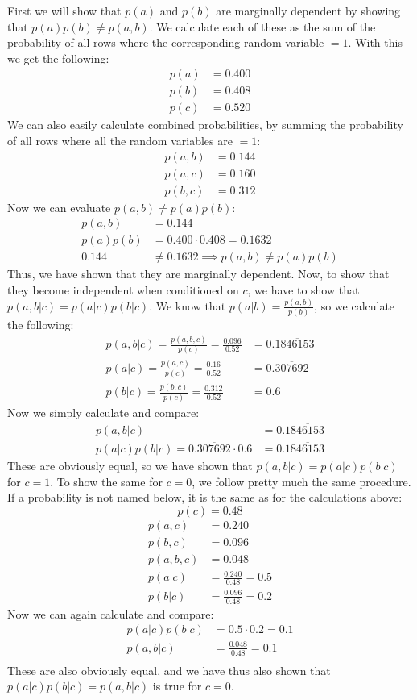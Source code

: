 First we will show that $p(a)$ and $p(b)$ are marginally dependent by showing that $p(a)p(b) \neq p(a,b)$. We calculate each of these as the sum of the probability of all rows where the corresponding random variable $=1$. With this we get the following:
\begin{align*}
  p(a) &= 0.400 \\
  p(b) &= 0.408 \\
  p(c) &= 0.520
\end{align*}
We can also easily calculate combined probabilities, by summing the probability of all rows where all the random variables are $=1$:
\begin{align*}
  p(a,b) &= 0.144 \\
  p(a,c) &= 0.160 \\
  p(b,c) &= 0.312
\end{align*}
Now we can evaluate $p(a,b) \neq p(a)p(b)$:
\begin{align*}
p(a,b) &= 0.144 \\
p(a)p(b) &= 0.400 \cdot 0.408 = 0.1632 \\
0.144 &\neq 0.1632 \implies p(a,b) \neq p(a)p(b)
\end{align*}
Thus, we have shown that they are marginally dependent. Now, to show that they become independent when conditioned on $c$, we have to show that $p(a,b|c) = p(a|c)p(b|c)$. We know that $p(a|b) = \frac{p(a,b)}{p(b)}$, so we calculate the following:
\begin{align*}
  p(a,b|c) = \frac{p(a,b,c)}{p(c)} = \frac{0.096}{0.52} &= 0.1\overline{846153} \\
  p(a|c) = \frac{p(a,c)}{p(c)} = \frac{0.16}{0.52} &= 0.\overline{307692} \\
  p(b|c) = \frac{p(b,c)}{p(c)} = \frac{0.312}{0.52} &= 0.6
\end{align*}
Now we simply calculate and compare:
\begin{align*}
  p(a,b|c) &= 0.1\overline{846153} \\
  p(a|c)p(b|c) = 0.\overline{307692} \cdot 0.6 &= 0.1\overline{846153}
\end{align*}
These are obviously equal, so we have shown that $p(a,b|c) = p(a|c)p(b|c)$ for $c=1$. To show the same for $c=0$, we follow pretty much the same procedure. If a probability is not named below, it is the same as for the calculations above:
$$
p(c) = 0.48
$$
\begin{align*}
  p(a,c) &= 0.240 \\
  p(b,c) &= 0.096 \\
  p(a,b,c) &= 0.048 \\
  p(a|c) &= \frac{0.240}{0.48} = 0.5 \\
  p(b|c) &= \frac{0.096}{0.48} = 0.2
\end{align*}
Now we can again calculate and compare:
\begin{align*}
  p(a|c)p(b|c) &= 0.5\cdot0.2 = 0.1 \\
  p(a,b|c) &= \frac{0.048}{0.48} = 0.1 \\
\end{align*}
These are also obviously equal, and we have thus also shown that $p(a|c)p(b|c) = p(a,b|c)$ is true for $c=0$.
